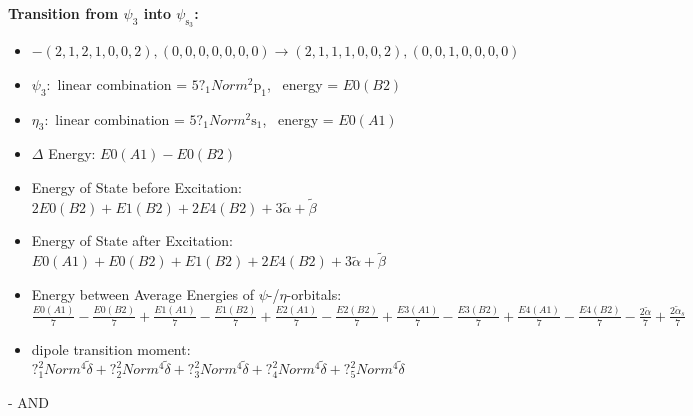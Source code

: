 \documentclass[12pt,a4paper]{article}
\begin{document}
        \noindent\textbf{Transition from $\psi_{3}$ into $\psi_{\text{s}_{3}}$:}
        \begin{itemize}
            \item $- (2, 1, 2, 1, 0, 0, 2), (0, 0, 0, 0, 0, 0, 0) \rightarrow (2, 1, 1, 1, 0, 0, 2), (0, 0, 1, 0, 0, 0, 0)$
        
            \item $\psi_{3}:$ linear combination = $5 ?_{1} Norm^{2} \text{p}_{1}$, \
            energy = $E0(B2)$
            
            \item $\eta_{3}:$ linear combination = $5 ?_{1} Norm^{2} \text{s}_{1}$, \
            energy = $E0(A1)$
            
                \item $\Delta$ Energy: $E0(A1) - E0(B2)$
                \item Energy of State before Excitation: $2 E0(B2) + E1(B2) + 2 E4(B2) + 3 \tilde{\alpha} + \tilde{\beta}$
                \item Energy of State after Excitation: $E0(A1) + E0(B2) + E1(B2) + 2 E4(B2) + 3 \tilde{\alpha} + \tilde{\beta}$
                \item Energy between Average Energies of $\psi$-/$\eta$-orbitals: $\frac{E0(A1)}{7} - \frac{E0(B2)}{7} + \frac{E1(A1)}{7} - \frac{E1(B2)}{7} + \frac{E2(A1)}{7} - \frac{E2(B2)}{7} + \frac{E3(A1)}{7} - \frac{E3(B2)}{7} + \frac{E4(A1)}{7} - \frac{E4(B2)}{7} - \frac{2 \tilde{\alpha}}{7} + \frac{2 \tilde{\alpha}_{s}}{7}$
            
            \item dipole transition moment: $?_{1}^{2} Norm^{4} \tilde{\delta} + ?_{2}^{2} Norm^{4} \tilde{\delta} + ?_{3}^{2} Norm^{4} \tilde{\delta} + ?_{4}^{2} Norm^{4} \tilde{\delta} + ?_{5}^{2} Norm^{4} \tilde{\delta}$
        
        \end{itemize}
        
 -  AND 
\end{document}
